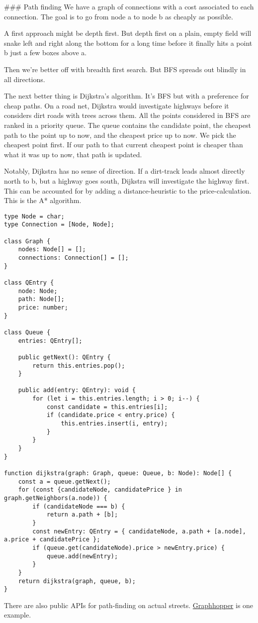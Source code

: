 ### Path finding
We have a graph of connections with a cost associated to each connection.
The goal is to go from node a to node b as cheaply as possible.

A first approach might be depth first. But depth first on a plain, empty field will snake left and right along the bottom 
for a long time before it finally hits a point b just a few boxes above a.

Then we're better off with breadth first search. But BFS spreads out blindly in all directions.

The next better thing is Dijkstra's algorithm. It's BFS but with a preference for cheap paths.
On a road net, Dijkstra would investigate highways before it considers dirt roads with trees across them.
All the points considered in BFS are ranked in a priority queue.
The queue contains the candidate point, the cheapest path to the point up to now, and the cheapest price up to now.
We pick the cheapest point first. If our path to that current cheapest point is cheaper than what it was up to now, that path is updated.

Notably, Dijkstra has no sense of direction.
If a dirt-track leads almost directly north to b, but a highway goes south, Dijkstra will investigate the highway first.
This can be accounted for by adding a distance-heuristic to the price-calculation.
This is the A* algorithm.

\begin{lstlisting}
type Node = char;
type Connection = [Node, Node];

class Graph {
    nodes: Node[] = [];
    connections: Connection[] = [];
}

class QEntry {
    node: Node;
    path: Node[];
    price: number;
}

class Queue {
    entries: QEntry[];

    public getNext(): QEntry {
        return this.entries.pop();
    }

    public add(entry: QEntry): void {
        for (let i = this.entries.length; i > 0; i--) {
            const candidate = this.entries[i];
            if (candidate.price < entry.price) {
                this.entries.insert(i, entry);
            }
        }
    }
}

function dijkstra(graph: Graph, queue: Queue, b: Node): Node[] {
    const a = queue.getNext();
    for (const {candidateNode, candidatePrice } in graph.getNeighbors(a.node)) {
        if (candidateNode === b) {
            return a.path + [b];
        }
        const newEntry: QEntry = { candidateNode, a.path + [a.node], a.price + candidatePrice };
        if (queue.get(candidateNode).price > newEntry.price) {
            queue.add(newEntry);
        }
    }
    return dijkstra(graph, queue, b);
}
\end{lstlisting}

There are also public APIs for path-finding on actual streets. \href{https://www.graphhopper.com/}{Graphhopper} is one example.
